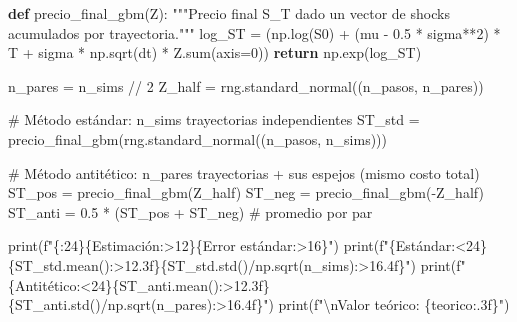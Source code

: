 \documentclass[
  spanish,
  letterpaper,
  DIV=11,
  numbers=noendperiod]{scrreprt}
\newenvironment{Shaded}{\begin{snugshade}}{\end{snugshade}}
\newcommand{\BuiltInTok}[1]{\textcolor[rgb]{0.00,0.23,0.31}{#1}}
\newcommand{\CharTok}[1]{\textcolor[rgb]{0.13,0.47,0.30}{#1}}
\newcommand{\CommentTok}[1]{\textcolor[rgb]{0.37,0.37,0.37}{#1}}
\newcommand{\ControlFlowTok}[1]{\textcolor[rgb]{0.00,0.23,0.31}{\textbf{#1}}}
\newcommand{\DecValTok}[1]{\textcolor[rgb]{0.68,0.00,0.00}{#1}}
\newcommand{\FloatTok}[1]{\textcolor[rgb]{0.68,0.00,0.00}{#1}}
\newcommand{\KeywordTok}[1]{\textcolor[rgb]{0.00,0.23,0.31}{\textbf{#1}}}
\newcommand{\NormalTok}[1]{\textcolor[rgb]{0.00,0.23,0.31}{#1}}
\newcommand{\OperatorTok}[1]{\textcolor[rgb]{0.37,0.37,0.37}{#1}}
\newcommand{\SpecialCharTok}[1]{\textcolor[rgb]{0.37,0.37,0.37}{#1}}
\newcommand{\SpecialStringTok}[1]{\textcolor[rgb]{0.13,0.47,0.30}{#1}}
\newcommand{\StringTok}[1]{\textcolor[rgb]{0.13,0.47,0.30}{#1}}
\begin{document}
\label{antiteticas}
\begin{Shaded}
\begin{Highlighting}[]
\KeywordTok{def}\NormalTok{ precio\_final\_gbm(Z):}
    \CommentTok{"""Precio final S\_T dado un vector de shocks acumulados por trayectoria."""}
\NormalTok{    log\_ST }\OperatorTok{=}\NormalTok{ (np.log(S0) }\OperatorTok{+}\NormalTok{ (mu }\OperatorTok{{-}} \FloatTok{0.5} \OperatorTok{*}\NormalTok{ sigma}\OperatorTok{**}\DecValTok{2}\NormalTok{) }\OperatorTok{*}\NormalTok{ T}
              \OperatorTok{+}\NormalTok{ sigma }\OperatorTok{*}\NormalTok{ np.sqrt(dt) }\OperatorTok{*}\NormalTok{ Z.}\BuiltInTok{sum}\NormalTok{(axis}\OperatorTok{=}\DecValTok{0}\NormalTok{))}
    \ControlFlowTok{return}\NormalTok{ np.exp(log\_ST)}

\NormalTok{n\_pares }\OperatorTok{=}\NormalTok{ n\_sims }\OperatorTok{//} \DecValTok{2}
\NormalTok{Z\_half }\OperatorTok{=}\NormalTok{ rng.standard\_normal((n\_pasos, n\_pares))}

\CommentTok{\# Método estándar: n\_sims trayectorias independientes}
\NormalTok{ST\_std }\OperatorTok{=}\NormalTok{ precio\_final\_gbm(rng.standard\_normal((n\_pasos, n\_sims)))}

\CommentTok{\# Método antitético: n\_pares trayectorias + sus espejos (mismo costo total)}
\NormalTok{ST\_pos }\OperatorTok{=}\NormalTok{ precio\_final\_gbm(Z\_half)}
\NormalTok{ST\_neg }\OperatorTok{=}\NormalTok{ precio\_final\_gbm(}\OperatorTok{{-}}\NormalTok{Z\_half)}
\NormalTok{ST\_anti }\OperatorTok{=} \FloatTok{0.5} \OperatorTok{*}\NormalTok{ (ST\_pos }\OperatorTok{+}\NormalTok{ ST\_neg)      }\CommentTok{\# promedio por par}

\BuiltInTok{print}\NormalTok{(}\SpecialStringTok{f"}\SpecialCharTok{\{}\StringTok{\textquotesingle{}\textquotesingle{}}\SpecialCharTok{:24\}\{}\StringTok{\textquotesingle{}Estimación\textquotesingle{}}\SpecialCharTok{:\textgreater{}12\}\{}\StringTok{\textquotesingle{}Error estándar\textquotesingle{}}\SpecialCharTok{:\textgreater{}16\}}\SpecialStringTok{"}\NormalTok{)}
\BuiltInTok{print}\NormalTok{(}\SpecialStringTok{f"}\SpecialCharTok{\{}\StringTok{\textquotesingle{}Estándar\textquotesingle{}}\SpecialCharTok{:\textless{}24\}\{}\NormalTok{ST\_std}\SpecialCharTok{.}\NormalTok{mean()}\SpecialCharTok{:\textgreater{}12.3f\}\{}\NormalTok{ST\_std}\SpecialCharTok{.}\NormalTok{std()}\OperatorTok{/}\NormalTok{np}\SpecialCharTok{.}\NormalTok{sqrt(n\_sims)}\SpecialCharTok{:\textgreater{}16.4f\}}\SpecialStringTok{"}\NormalTok{)}
\BuiltInTok{print}\NormalTok{(}\SpecialStringTok{f"}\SpecialCharTok{\{}\StringTok{\textquotesingle{}Antitético\textquotesingle{}}\SpecialCharTok{:\textless{}24\}\{}\NormalTok{ST\_anti}\SpecialCharTok{.}\NormalTok{mean()}\SpecialCharTok{:\textgreater{}12.3f\}\{}\NormalTok{ST\_anti}\SpecialCharTok{.}\NormalTok{std()}\OperatorTok{/}\NormalTok{np}\SpecialCharTok{.}\NormalTok{sqrt(n\_pares)}\SpecialCharTok{:\textgreater{}16.4f\}}\SpecialStringTok{"}\NormalTok{)}
\BuiltInTok{print}\NormalTok{(}\SpecialStringTok{f"}\CharTok{\textbackslash{}n}\SpecialStringTok{Valor teórico: }\SpecialCharTok{\{}\NormalTok{teorico}\SpecialCharTok{:.3f\}}\SpecialStringTok{"}\NormalTok{)}
\end{Highlighting}
\end{Shaded}
\end{document}
